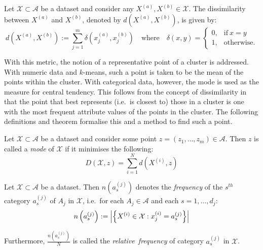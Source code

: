 \documentclass[smallextended]{svjour3}
\DeclarePairedDelimiter\abs{\lvert}{\rvert}%
\begin{document}
\begin{definition}\label{def:dissim}
    Let \(\mathcal{X} \subset \mathcal A\) be a dataset and consider any
    \(X^{(a)}, X^{(b)} \in \mathcal{X}\). The dissimilarity between \(X^{(a)}\)
    and \(X^{(b)}\), denoted by \(d\left(X^{(a)}, X^{(b)}\right)\), is given by:
    \begin{equation}\label{eq:dissim}
        d\left(X^{(a)}, X^{(b)}\right) := \sum_{j=1}^{m} \delta\left(x_j^{(a)},
        x_j^{(b)}\right) \quad \text{where} \quad \delta\left(x, y\right) =
        \begin{cases}
            0, & \text{if} \ x = y \\
            1, & \text{otherwise.}
        \end{cases}
    \end{equation}
\end{definition}

With this metric, the notion of a representative point of a cluster is
addressed. With numeric data and \(k\)-means, such a point is taken to be the
mean of the points within the cluster. With categorical data, however, the mode
is used as the measure for central tendency. This follows from the concept of
dissimilarity in that the point that best represents (i.e.\ is closest to) those
in a cluster is one with the most frequent attribute values of the points in the
cluster. The following definitions and theorem formalise this and a method to
find such a point.

\begin{definition}\label{def:mode}
    Let \(\mathcal{X} \subset \mathcal{A}\) be a dataset and consider some point
    \(z = \left(z_1, \ldots, z_m\right) \in \mathcal{A}\). Then \(z\) is called
    a \emph{mode} of \(\mathcal{X}\) if it minimises the following:
    \begin{equation}\label{eq:summed-dissim}
        D\left(\mathcal{X}, z\right) = \sum_{i=1}^{N} d\left(X^{(i)}, z\right)
    \end{equation}
\end{definition}

\begin{definition}\label{def:rel-freq}
    Let \(\mathcal{X} \subset \mathcal{A}\) be a dataset. Then
    \(n\left(a_s^{(j)}\right)\) denotes the \emph{frequency} of the \(s^{th}\)
    category \(a_s^{(j)}\) of \(A_j\) in \(\mathcal{X}\), i.e.\ for each \(A_j
    \in \mathcal{A}\) and each \(s = 1, \ldots, d_j\):
    \begin{equation}
        n\left(a_s^{(j)}\right) := \abs*{%
            {\left\{X^{(i)} \in \mathcal{X}: x_j^{(i)} = a_s^{(j)}\right\}}
        }
    \end{equation}
	
    Furthermore, \(\frac{n\left(a_s^{(j)}\right)}{N}\) is called the
    \emph{relative~frequency} of category \(a_s^{(j)}\) in \(\mathcal{X}\).
\end{definition}
\end{document}

